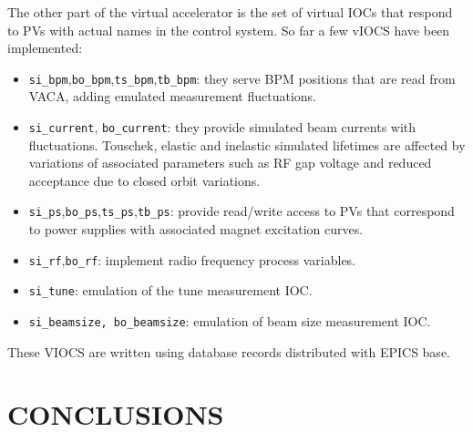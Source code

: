 \documentclass[a4paper,
              ]{jacow}
\begin{document}
The other part of the virtual accelerator is the set of virtual IOCs that respond to PVs with actual names in the control system.
So far a few vIOCS have been implemented:
\begin{itemize}
\item \verb|si_bpm|,\verb|bo_bpm|,\verb|ts_bpm|,\verb|tb_bpm|: they serve BPM positions that are read from VACA, adding emulated measurement fluctuations.
\item \verb|si_current|, \verb|bo_current|: they provide simulated beam currents with fluctuations. Touschek, elastic and inelastic simulated lifetimes are affected by variations of associated parameters such as RF gap voltage and reduced acceptance due to closed orbit variations.
\item \verb|si_ps|,\verb|bo_ps|,\verb|ts_ps|,\verb|tb_ps|: provide read/write access to PVs that correspond to power supplies with associated magnet excitation curves.
\item \verb|si_rf|,\verb|bo_rf|: implement radio frequency process variables.
\item \verb|si_tune|: emulation of the tune measurement IOC.
\item \verb|si_beamsize, bo_beamsize|: emulation of beam size measurement IOC.
\end{itemize}
These VIOCS are written using database records distributed with EPICS base.

\section{CONCLUSIONS}
\end{document}
